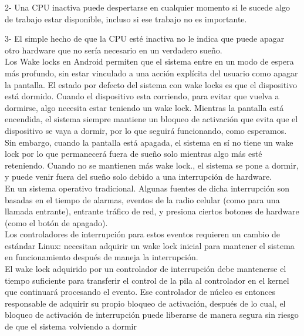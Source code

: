\documentclass[a4paper]{article}
\begin{document}
2-	Una CPU inactiva puede despertarse en cualquier momento si le sucede algo de trabajo estar disponible, incluso si ese trabajo no es importante.

3-	El simple hecho de que la CPU esté inactiva no le indica que puede apagar otro
hardware que no sería necesario en un verdadero sueño.\\

Los Wake locks en Android permiten que el sistema entre en un modo de espera más profundo, sin
estar vinculado a una acción explícita del usuario como apagar la pantalla. El estado por defecto
  del sistema con wake locks es que el dispositivo está dormido. 
Cuando el dispositivo esta  corriendo, para evitar que vuelva a dormirse, algo necesita estar teniendo un wake lock.
Mientras la pantalla está encendida, el sistema siempre mantiene un bloqueo de activación que evita que el dispositivo se vaya a dormir, por lo que seguirá funcionando, como esperamos.
Sin embargo, cuando la pantalla está apagada, el sistema en sí no tiene un wake lock
por lo que permanecerá fuera de sueño solo mientras algo más esté reteniendo.
Cuando no se mantienen más wake lock., el sistema se pone a dormir, y puede venir
fuera del sueño solo debido a una interrupción de hardware.\\



En un sistema operativo tradicional. Algunas fuentes de dicha interrupción son basadas en el tiempo de alarmas, eventos de la radio celular (como para una llamada entrante), entrante
tráfico de red, y presiona ciertos botones de hardware (como el botón de apagado).\\

 Los controladores de interrupción para estos eventos requieren un cambio de estándar                     Linux: necesitan adquirir un wake lock inicial para mantener el sistema en funcionamiento después de maneja la interrupción.\\
 
El  wake lock adquirido por un controlador de interrupción debe mantenerse el tiempo suficiente para transferir el control de la pila al controlador en el kernel que continuará procesando                           el evento. Ese controlador de núcleo es entonces responsable de adquirir su propio bloqueo de activación, después de lo cual, el bloqueo de activación de interrupción puede liberarse de manera segura sin riesgo de que el sistema volviendo a dormir


\newpage 
\end{document}
